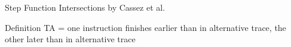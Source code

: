 \documentclass{beamer}
\begin{document}
\begin{frame}{Step Function Intersections by Cassez et al.}
    \begin{block}{Definition}
        TA = one instruction finishes earlier than in alternative trace, the other later than in alternative trace
    \end{block}

    
\end{frame}
\end{document}
